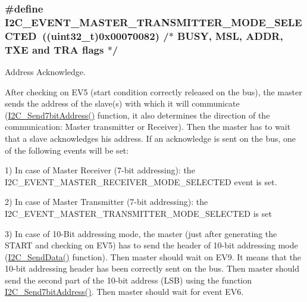 \hypertarget{group___i2_c___events_ga2361a6e60b7dc86fb682dd06fbd3edb7}{
\subsubsection[{I2\-C\-\_\-\-E\-V\-E\-N\-T\-\_\-\-M\-A\-S\-T\-E\-R\-\_\-\-T\-R\-A\-N\-S\-M\-I\-T\-T\-E\-R\-\_\-\-M\-O\-D\-E\-\_\-\-S\-E\-L\-E\-C\-T\-E\-D}]{\setlength{\rightskip}{0pt plus 5cm}\#define I2\-C\-\_\-\-E\-V\-E\-N\-T\-\_\-\-M\-A\-S\-T\-E\-R\-\_\-\-T\-R\-A\-N\-S\-M\-I\-T\-T\-E\-R\-\_\-\-M\-O\-D\-E\-\_\-\-S\-E\-L\-E\-C\-T\-E\-D~((uint32\-\_\-t)0x00070082)  /$\ast$ B\-U\-S\-Y, M\-S\-L, A\-D\-D\-R, T\-X\-E and T\-R\-A flags $\ast$/}}\label{group___i2_c___events_ga2361a6e60b7dc86fb682dd06fbd3edb7}


Address Acknowledge. 

After checking on E\-V5 (start condition correctly released on the bus), the master sends the address of the slave(s) with which it will communicate (\hyperlink{group___i2_c_ga009fc2a5b2313c36da39ece39a1156a6}{I2\-C\-\_\-\-Send7bit\-Address()} function, it also determines the direction of the communication\-: Master transmitter or Receiver). Then the master has to wait that a slave acknowledges his address. If an acknowledge is sent on the bus, one of the following events will be set\-:

1) In case of Master Receiver (7-\/bit addressing)\-: the I2\-C\-\_\-\-E\-V\-E\-N\-T\-\_\-\-M\-A\-S\-T\-E\-R\-\_\-\-R\-E\-C\-E\-I\-V\-E\-R\-\_\-\-M\-O\-D\-E\-\_\-\-S\-E\-L\-E\-C\-T\-E\-D event is set.

2) In case of Master Transmitter (7-\/bit addressing)\-: the I2\-C\-\_\-\-E\-V\-E\-N\-T\-\_\-\-M\-A\-S\-T\-E\-R\-\_\-\-T\-R\-A\-N\-S\-M\-I\-T\-T\-E\-R\-\_\-\-M\-O\-D\-E\-\_\-\-S\-E\-L\-E\-C\-T\-E\-D is set

3) In case of 10-\/\-Bit addressing mode, the master (just after generating the S\-T\-A\-R\-T and checking on E\-V5) has to send the header of 10-\/bit addressing mode (\hyperlink{group___i2_c_ga7bd9e70b8eafde0dd5eb42b0d95fe1a9}{I2\-C\-\_\-\-Send\-Data()} function). Then master should wait on E\-V9. It means that the 10-\/bit addressing header has been correctly sent on the bus. Then master should send the second part of the 10-\/bit address (L\-S\-B) using the function \hyperlink{group___i2_c_ga009fc2a5b2313c36da39ece39a1156a6}{I2\-C\-\_\-\-Send7bit\-Address()}. Then master should wait for event E\-V6. 

